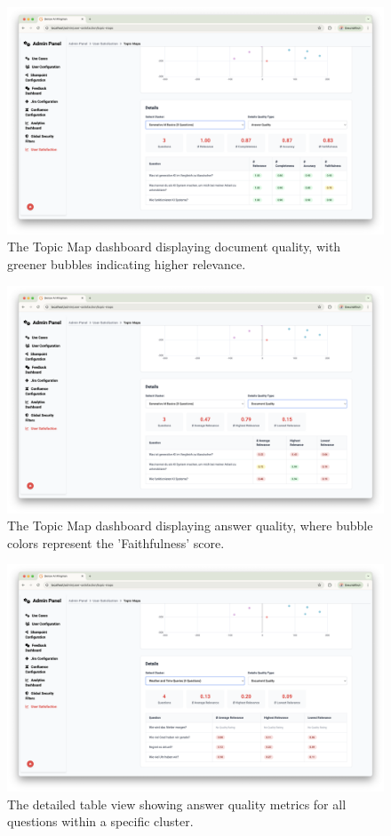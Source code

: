 \documentclass[
	english,
	ruledheaders=section,%
	class=report,%
	thesis={type=bachelor},%
	accentcolor=1b,%
	custommargins=true,%
	marginpar=false,%
	parskip=half-,%
	fontsize=11pt,%
	DIV=14,
]{tudapub}
\begin{document}
\begin{figure}[h!]
    \centering
    \includegraphics[width=0.75\linewidth]{images/TopicMaps3.png}
    \caption{The Topic Map dashboard displaying document quality, with greener bubbles indicating higher relevance.}
    \label{fig:topic_maps_doc_quality}
\end{figure}

\begin{figure}[h!]
    \centering
    \includegraphics[width=0.75\linewidth]{images/TopicMaps4.png}
    \caption{The Topic Map dashboard displaying answer quality, where bubble colors represent the 'Faithfulness' score.}
    \label{fig:topic_maps_ans_quality}
\end{figure}

\begin{figure}[h!]
    \centering
    \includegraphics[width=0.75\linewidth]{images/TopicMaps5.png}
    \caption{The detailed table view showing answer quality metrics for all questions within a specific cluster.}
    \label{fig:topic_maps_detail_table}
\end{figure}
\end{document}
